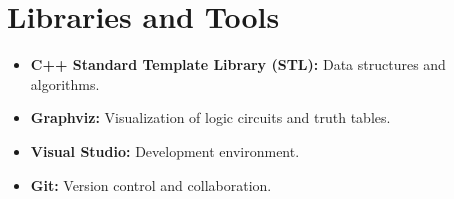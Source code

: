 \section{Libraries and Tools}
\begin{itemize}
    \item \textbf{C++ Standard Template Library (STL):} Data structures and algorithms.
    \item \textbf{Graphviz:} Visualization of logic circuits and truth tables.
    \item \textbf{Visual Studio:} Development environment.
    \item \textbf{Git:} Version control and collaboration.
\end{itemize}